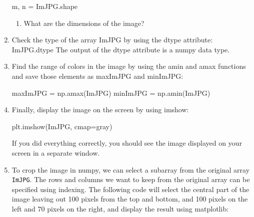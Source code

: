\documentclass[11pt]{article}
\providecommand{\tightlist}{%
      \setlength{\itemsep}{0pt}\setlength{\parskip}{0pt}}
\newenvironment{Shaded}{}{}
\newcommand{\StringTok}[1]{\textcolor[rgb]{0.25,0.44,0.63}{{#1}}}
\newcommand{\NormalTok}[1]{{#1}}
\newcommand{\OperatorTok}[1]{\textcolor[rgb]{0.40,0.40,0.40}{{#1}}}
\begin{document}
\begin{enumerate}
\begin{Shaded}
\begin{tcolorbox}[breakable, size=fbox, boxrule=1pt, pad at break*=1mm,colback=cellbackground, colframe=cellborder]
  \begin{Highlighting}[]
\NormalTok{m, n }\OperatorTok{=}\NormalTok{ ImJPG.shape}
\end{Highlighting}
\end{tcolorbox}
\end{Shaded}

  \begin{enumerate}
  \def\labelenumii{\arabic{enumii}.}
  \tightlist
  \item
    What are the dimensions of the image?
  \end{enumerate}
\item
  Check the type of the array ImJPG by using the dtype attribute:
  ImJPG.dtype The output of the dtype attribute is a numpy data type.
\item
  Find the range of colors in the image by using the amin and amax
  functions and save those elements as maxImJPG and minImJPG:

\begin{Shaded}
\begin{tcolorbox}[breakable, size=fbox, boxrule=1pt, pad at break*=1mm,colback=cellbackground, colframe=cellborder]
  \begin{Highlighting}[]
\NormalTok{maxImJPG }\OperatorTok{=}\NormalTok{ np.amax(ImJPG)}
\NormalTok{minImJPG }\OperatorTok{=}\NormalTok{ np.amin(ImJPG)}
\end{Highlighting}
\end{tcolorbox}
\end{Shaded}
\item
  Finally, display the image on the screen by using imshow:

\begin{Shaded}
\begin{tcolorbox}[breakable, size=fbox, boxrule=1pt, pad at break*=1mm,colback=cellbackground, colframe=cellborder]
  \begin{Highlighting}[]
\NormalTok{plt.imshow(ImJPG, cmap}\OperatorTok{=}\StringTok{\textquotesingle{}gray\textquotesingle{}}\NormalTok{)}
\end{Highlighting}
\end{tcolorbox}
\end{Shaded}

  If you did everything correctly, you should see the image displayed on
  your screen in a separate window.
\item
  To crop the image in numpy, we can select a subarray from the original
  array \texttt{ImJPG}. The rows and columns we want to keep from the
  original array can be specified using indexing. The following code
  will select the central part of the image leaving out 100 pixels from
  the top and bottom, and 100 pixels on the left and 70 pixels on the
  right, and display the result using matplotlib:


\end{enumerate}
\end{document}
